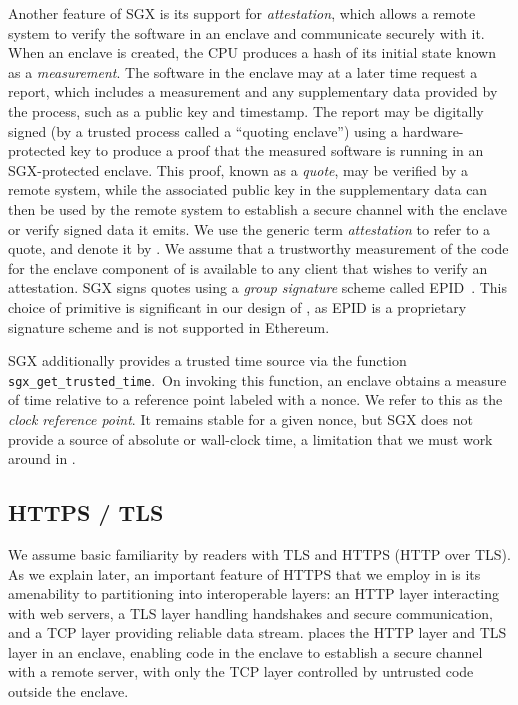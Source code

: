 Another feature of SGX is its support for \emph{attestation}, which allows a remote system to verify the software in an enclave and communicate securely with it. When an enclave is created, the CPU produces a hash of its initial state known as a {\em measurement}. The software in the enclave may at a later time request a report, which includes a measurement and any supplementary data provided by the process, such as a public key and timestamp. The report may be digitally signed (by a trusted process called a ``quoting enclave'') using a hardware-protected key to produce a proof that the measured software is running in an SGX-protected enclave. This proof, known as a {\em quote}, may be verified by a remote system, while the associated public key in the supplementary data can then be used by the remote system to establish a secure channel with the enclave or verify signed data it emits. We use the generic term {\em attestation} to refer to a quote, and denote it by \att. We assume that a trustworthy measurement of the code for the enclave component of \tc is available to any client that wishes to verify an attestation. SGX signs quotes using a \emph{group signature} scheme called EPID~\cite{}. This choice of primitive is significant in our design of \tcs, as EPID is a proprietary signature scheme and is not supported in Ethereum.

SGX additionally provides a trusted time source via the function \texttt{sgx\_get\_trusted\_time}.~On invoking this function, an enclave obtains a measure of time relative to a reference point labeled with a nonce. We refer to this as the \emph{clock reference point}. It remains stable for a given nonce, but SGX does not provide a source of absolute or wall-clock time, a limitation that we must work around in \tc.

\subsection{HTTPS / TLS}

We assume basic familiarity by readers with TLS and HTTPS (HTTP over TLS). As we explain later, an important feature of HTTPS that we employ in \tc is its amenability to partitioning into interoperable layers: an HTTP layer interacting with web servers, a TLS layer handling handshakes and secure communication, and a TCP layer providing reliable data stream. \tc places the HTTP layer and TLS layer in an enclave, enabling code in the enclave to establish a secure channel with a remote server, with only the TCP layer controlled by untrusted code outside the enclave. 


